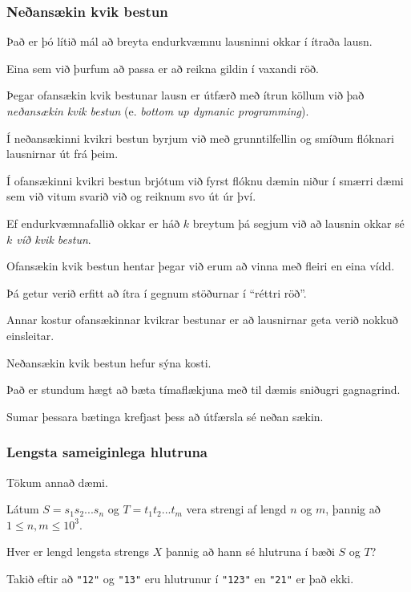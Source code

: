 {
	\frametitle{Neðansækin kvik bestun}
	{
		\item<1-> Það er þó lítið mál að breyta endurkvæmnu lausninni okkar í ítraða lausn.
		\item<2-> Eina sem við þurfum að passa er að reikna gildin í vaxandi röð.
		\item<3->[]
		\item<4-> Þegar ofansækin kvik bestunar lausn er útfærð með ítrun köllum við það \emph{neðansækin kvik bestun} 
					(e. \emph{bottom up dymanic programming}).
	}
}

{
	{
		\item<1-> Í neðansækinni kvikri bestun byrjum við með grunntilfellin og smíðum flóknari lausnirnar út frá þeim.
		\item<2-> Í ofansækinni kvikri bestun brjótum við fyrst flóknu dæmin niður í smærri dæmi sem við vitum svarið við og reiknum svo út úr því.
		\item<3-> Ef endurkvæmnafallið okkar er háð $k$ breytum þá segjum við að lausnin okkar sé \emph{$k$ víð kvik bestun}.
		\item<4-> Ofansækin kvik bestun hentar þegar við erum að vinna með fleiri en eina vídd.
		\item<5-> Þá getur verið erfitt að ítra í gegnum stöðurnar í ``réttri röð''.
	}
}

{
	{
		\item<1-> Annar kostur ofansækinnar kvikrar bestunar er að lausnirnar geta verið nokkuð einsleitar.
		\item<2->[] 
	}
}

{
	{
		\item<1-> Neðansækin kvik bestun hefur sýna kosti.
		\item<2-> Það er stundum hægt að bæta tímaflækjuna með til dæmis sniðugri gagnagrind.
		\item<3-> Sumar þessara bætinga krefjast þess að útfærsla sé neðan sækin.
	}
}

{
	\frametitle{Lengsta sameiginlega hlutruna}
	{
		\item<1-> Tökum annað dæmi.
		\item<2-> Látum $S = s_1s_2...s_n$ og $T = t_1t_2...t_m$ vera strengi af lengd $n$ og $m$, þannig að $1 \leq n, m \leq 10^3$.
		\item<3-> Hver er lengd lengsta strengs $X$ þannig að hann sé hlutruna í bæði $S$ og $T$?
		\item<4-> Takið eftir að \texttt{"12"} og \texttt{"13"} eru hlutrunur í \texttt{"123"} en \texttt{"21"} er það ekki.
	}
}


